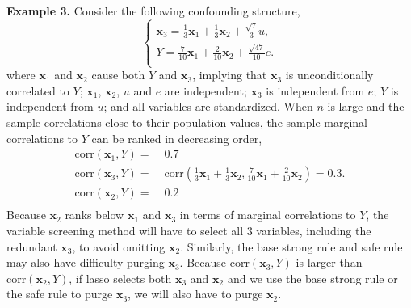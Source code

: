 \documentclass[12pt]{article}
\begin{document}
\smallskip
\noindent
\textbf{Example 3.} Consider the following confounding structure,
%
\begin{equation}
	\begin{cases}
    \mathbf{x}_3 = \frac{1}{3} \mathbf{x}_1 + \frac{1}{3} \mathbf{x}_2 + \frac{\sqrt{7}}{3} u, \\
    Y = \frac{7}{10} \mathbf{x}_1 +  \frac{2}{10} \mathbf{x}_2 +  \frac{\sqrt{47}}{10} e. \\
	\end{cases}
	\label{eqn:example_4}
\end{equation}
%
where $\mathbf{x}_1$ and $\mathbf{x}_2$ cause both $Y$ and $\mathbf{x}_3$, implying that $\mathbf{x}_3$ is unconditionally correlated to $Y$; $\mathbf{x}_1$, $\mathbf{x}_2$, $u$ and $e$ are independent; $\mathbf{x}_3$ is independent from $e$; $Y$ is independent from $u$; and all variables are standardized. When $n$ is large and the sample correlations close to their population values, the sample marginal correlations to $Y$ can be ranked in decreasing order,
%
\begin{equation}
  \begin{aligned}
    \mathrm{corr} \left( \mathbf{x}_1, Y \right)  = & \;0.7 \\
    \mathrm{corr} \left( \mathbf{x}_3, Y \right)  = & \;\mathrm{corr} \left( \frac{1}{3} \mathbf{x}_1 + \frac{1}{3} \mathbf{x}_2, \frac{7}{10} \mathbf{x}_1 +  \frac{2}{10} \mathbf{x}_2 \right)
    = 0.3. \\
    \mathrm{corr} \left( \mathbf{x}_2, Y \right)  = & \;0.2 \\
  \end{aligned}
\end{equation}
%
Because $\mathbf{x}_2$ ranks below $\mathbf{x}_1$ and $\mathbf{x}_3$ in terms of marginal correlations to $Y$, the variable screening method will have to select all $3$ variables, including the redundant $\mathbf{x}_3$, to avoid omitting $\mathbf{x}_2$. Similarly, the base strong rule and safe rule may also have difficulty purging $\mathbf{x}_3$. Because $\mathrm{corr} \left( \mathbf{x}_3, Y \right)$ is larger than $\mathrm{corr} \left( \mathbf{x}_2, Y \right)$, if lasso selects both $\mathbf{x}_3$ and $\mathbf{x}_2$ and we use the base strong rule or the safe rule to purge $\mathbf{x}_3$, we will also have to purge $\mathbf{x}_2$.
\end{document}
